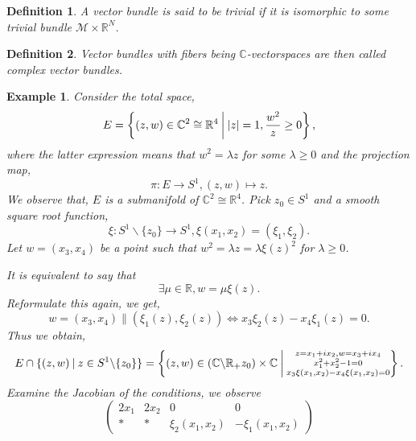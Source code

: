 \documentclass[8pt]{article}
\newtheorem{definition}{Definition}[section]
\newtheorem{example}{Example}[section]
\newcommand{\R}[0]{\mathbb{R}}
\newcommand{\C}[0]{\mathbb{C}}
\newcommand{\M}[0]{\mathcal{M}}
\newcommand{\sep}[0]{\:|\:}
\begin{document}
\begin{definition}
  A vector bundle is said to be trivial if it is isomorphic to some trivial bundle $\M\times \R^N$.
\end{definition}

\begin{definition}
  Vector bundles with fibers being $\C$-vectorspaces are then called complex vector bundles.
\end{definition}
\begin{example}Consider the total space,
  \begin{equation*}
    E = \left\{(z,w)\in\C^2\cong\R^4\:\bigg{|}\: \vert z\vert = 1, {\frac {w^2} {z}}\geq 0\right\},
  \end{equation*}
  where the latter expression means that $w^2 = \lambda z$ for some $\lambda\geq0$ and the projection map,
  \begin{equation*}
    \pi:E\to S^1,(z,w)\mapsto z.
  \end{equation*}
  We observe that, $E$ is a submanifold of $\C^2\cong\R^4$. Pick $z_0\in S^1$ and a smooth square root function,
  \begin{equation*}
    \xi:S^1\backslash\{z_0\}\to S^1,\xi(x_1,x_2) = (\xi_1,\xi_2).
  \end{equation*}
  Let $w=(x_3,x_4)$ be a point such that $w^2 = \lambda z = \lambda\xi(z)^2$ for $\lambda\geq0$.
  \par It is equivalent to say that 
  \begin{equation*}
    \exists \mu\in\R,w = \mu\xi(z).
  \end{equation*}
  Reformulate this again, we get,
  \begin{equation*}
    w = (x_3,x_4)\parallel(\xi_1(z),\xi_2(z))\Leftrightarrow x_3\xi_2(z)-x_4\xi_1(z) = 0.
  \end{equation*}
  Thus we obtain,
  \begin{equation*}
    E\cap\{(z,w)\sep z\in S^1\backslash\{z_0\}\} = \left\{(z,w)\in(\C\backslash\R_+z_0)\times \C\:\bigg{|}\:\substack{z=x_1+ix_2,w=x_3+ix_4\\x_1^2+x_2^2-1=0\\ x_3\xi(x_1,x_2)-x_4\xi(x_1,x_2)=0}\right\}.
  \end{equation*}
  Examine the Jacobian of the conditions, we observe
  \begin{equation*}
    \begin{pmatrix}
      2x_1 & 2x_2 & 0 & 0\\
      \ast & \ast & \xi_2(x_1,x_2)&-\xi_1(x_1,x_2)

\end{pmatrix}
\end{equation*}
\end{example}
\end{document}
